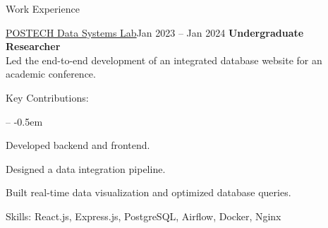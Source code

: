 \documentclass{resume}
\begin{document}
\begin{rSection}{Work Experience}
	\begin{rSubsection}{\href{https://dslab.postech.ac.kr/}{POSTECH Data Systems Lab}}{Jan 2023 -- Jan 2024}
		\textbf{Undergraduate Researcher}
		\\ [0.2em]
	  Led the end-to-end development of an integrated database website for an academic conference.

		\item Key Contributions:
		\vspace{-0.5em}
		\begin{list}{--}{}
			\itemsep -0.5em
			\item Developed backend and frontend.
			\item Designed a data integration pipeline.
			\item Built real-time data visualization and optimized database queries.
		\end{list}
		\item Skills: React.js, Express.js, PostgreSQL, Airflow, Docker, Nginx %
	\end{rSubsection}
\end{rSection}
\end{document}
